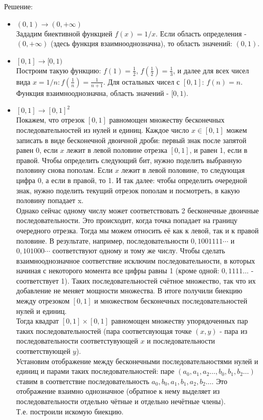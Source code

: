 \documentclass{article}
\begin{document}
Решение:
\begin{itemize}
\item $(0, 1) \rightarrow (0, +\infty)$\\

Зададим биективной функцией $f(x) = 1/x$. Если область определения - $(0, +\infty)$ (здесь функция взаимнооднозначна), то область значений: $(0, 1)$.\\

\item $[0, 1] \rightarrow [0, 1)$\\

Построим такую функцию: $f(1)=\frac{1}{2}$, $f(\frac{1}{2})=\frac{1}{3}$, и далее для всех чисел вида $x = 1/n: f\left(\frac{1}{n}\right)=\frac{1}{n+1}$. Для остальных чисел с $[0, 1]$: $f(n) = n$. Функция взаимнооднозначна, область значений - $[0, 1)$.\\

\item $[0, 1] \rightarrow [0, 1]^2$\\

Покажем, что отрезок $[0, 1]$ равномощен множеству бесконечных последовательностей из нулей и единиц. Каждое число $x \in [0, 1]$ можем записать в виде бесконечной двоичной дроби: первый знак после запятой равен 0, если $x$ лежит в левой половине отрезка $[0, 1]$, и равен 1, если в правой. Чтобы определить следующий бит, нужно поделить выбранную половину снова пополам. Если $x$ лежит в левой половине, то следующая цифра 0, а если в правой, то 1. И так далее: чтобы определить очередной знак, нужно поделить текущий отрезок пополам и посмотреть, в какую половину попадает x.\\
Однако сейчас одному числу может соответствовать 2 бесконечные двоичные последовательности. Это происходит, когда точка попадает на границу очередного отрезка. Тогда мы можем относить её как к левой, так и к правой половине. В результате, например, последовательности $0,1001111 \cdots$ и $0,101000\cdots$ соответствуют одному и тому же числу.
Чтобы сделать взаимнооднозначное соответствие исключим последовательности, в которых начиная с некоторого момента все цифры равны 1 (кроме одной: $ 0,1111 \ldots $ - соответствует 1). Таких последовательностей счётное множество, так что их добавление не меняет мощности множества. В итоге получили биекцию между отрезоком $[0, 1]$ и множеством бесконечных последовательностей нулей и единиц.\\

Тогда квадрат $[0, 1]\times [0, 1]$ равномощен множеству упорядоченных пар таких последовательностей (пара соответсвующая точке $(x,y)$ - пара из последовательности соответстувующей $x$ и последовательности соответствующей $y$).\\
Установим отображение между бесконечными последовательностями нулей и единиц и парами таких последовательностей: паре $ (a_0,a_1,a_2 \ldots, b_0,b_1,b_2 \ldots) $ ставим в соответствие последовательность $ a_0,b_0,a_1,b_1,a_2,b_2 \ldots $. Это отображение взаимно однозначное (обратное к нему выделяет из последовательности отдельно чётные и отдельно нечётные члены).\\
Т.е. построили искомую биекцию.\\


\end{itemize}
\end{document}
